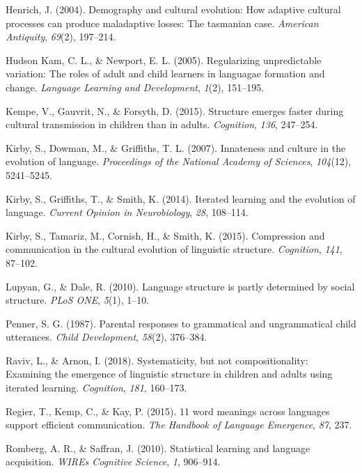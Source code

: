 \documentclass[10pt, letterpaper]{article}
\begin{document}
\hypertarget{ref-henrich-2004}{}
Henrich, J. (2004). Demography and cultural evolution: How adaptive
cultural processes can produce maladaptive losses: The tasmanian case.
\emph{American Antiquity}, \emph{69}(2), 197--214.

\hypertarget{ref-hudsonkam-2005}{}
Hudson Kam, C. L., \& Newport, E. L. (2005). Regularizing unpredictable
variation: The roles of adult and child learners in languagae formation
and change. \emph{Language Learning and Development}, \emph{1}(2),
151--195.

\hypertarget{ref-kempe-2015}{}
Kempe, V., Gauvrit, N., \& Forsyth, D. (2015). Structure emerges faster
during cultural transmission in children than in adults.
\emph{Cognition}, \emph{136}, 247--254.

\hypertarget{ref-kirby-2007}{}
Kirby, S., Dowman, M., \& Griffiths, T. L. (2007). Innateness and
culture in the evolution of language. \emph{Proceedings of the National
Academy of Sciences}, \emph{104}(12), 5241--5245.

\hypertarget{ref-kirby-2014}{}
Kirby, S., Griffiths, T., \& Smith, K. (2014). Iterated learning and the
evolution of language. \emph{Current Opinion in Neurobiology},
\emph{28}, 108--114.

\hypertarget{ref-kirby-2015}{}
Kirby, S., Tamariz, M., Cornish, H., \& Smith, K. (2015). Compression
and communication in the cultural evolution of linguistic structure.
\emph{Cognition}, \emph{141}, 87--102.

\hypertarget{ref-lupyan-2010}{}
Lupyan, G., \& Dale, R. (2010). Language structure is partly determined
by social structure. \emph{PLoS ONE}, \emph{5}(1), 1--10.

\hypertarget{ref-penner-1987}{}
Penner, S. G. (1987). Parental responses to grammatical and
ungrammatical child utterances. \emph{Child Development}, \emph{58}(2),
376--384.

\hypertarget{ref-raviv-2018}{}
Raviv, L., \& Arnon, I. (2018). Systematicity, but not compositionality:
Examining the emergence of linguistic structure in children and adults
using iterated learning. \emph{Cognition}, \emph{181}, 160--173.

\hypertarget{ref-regier2015}{}
Regier, T., Kemp, C., \& Kay, P. (2015). 11 word meanings across
languages support efficient communication. \emph{The Handbook of
Language Emergence}, \emph{87}, 237.

\hypertarget{ref-romberg-2010}{}
Romberg, A. R., \& Saffran, J. (2010). Statistical learning and language
acquisition. \emph{WIREs Cognitive Science}, \emph{1}, 906--914.
\end{document}
